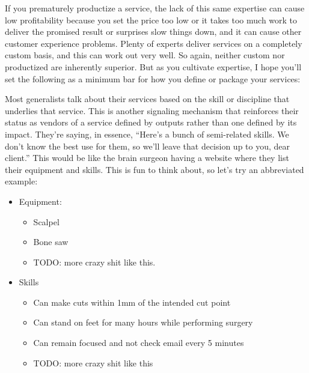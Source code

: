 If you prematurely productize a service, the lack of this same expertise can cause low profitability because you set the price too low or it takes too much work to deliver the promised result or surprises slow things down, and it can cause other customer experience problems. Plenty of experts deliver services on a completely custom basis, and this can work out very well. So again, neither custom nor productized are inherently superior. But as you cultivate expertise, I hope you'll set the following as a minimum bar for how you define or package your services:

Most generalists talk about their services based on the skill or discipline that underlies that service. This is another signaling mechanism that reinforces their status as vendors of a service defined by outputs rather than one defined by its impact. They're saying, in essence, ``Here's a bunch of semi-related skills. We don't know the best use for them, so we'll leave that decision up to you, dear client.'' This would be like the brain surgeon having a website where they list their equipment and skills. This is fun to think about, so let’s try an abbreviated example:

\begin{itemize}
\item Equipment:


\begin{itemize}
\item Scalpel
\item Bone saw
\item TODO: more crazy shit like this.
\end{itemize}
\item Skills


\begin{itemize}
\item Can make cuts within 1mm of the intended cut point
\item Can stand on feet for many hours while performing surgery
\item Can remain focused and not check email every 5 minutes
\item TODO: more crazy shit like this
\end{itemize}
\end{itemize}


